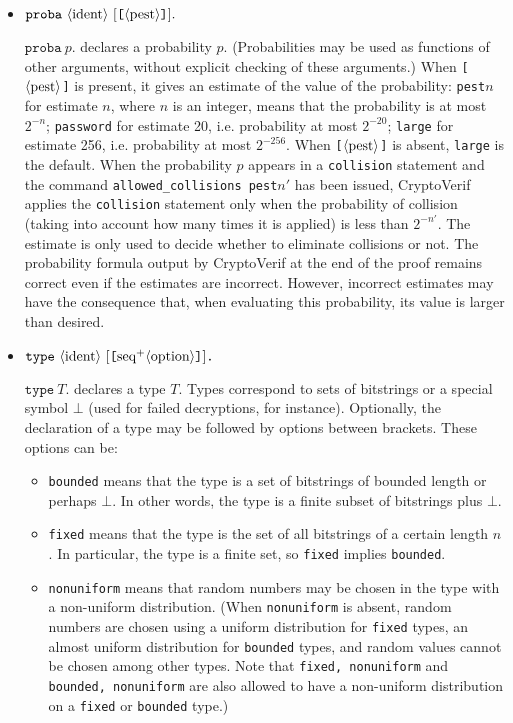 \begin{itemize}
\item $\texttt{proba}\ \nonterm{ident}\ [\texttt{[$\nonterm{pest}$]}].$

$\texttt{proba}\ p\texttt{.}$ declares a probability $p$.
(Probabilities may be used as functions of other arguments,
without explicit checking of these arguments.)
When \texttt{[$\langle\textrm{pest}\rangle$]} is present, 
it gives an estimate of the value of the probability:
\texttt{pest$n$} for estimate $n$, where $n$ is an integer, means that the probability is at most $2^{-n}$;
\texttt{password} for estimate 20, i.e. probability at most $2^{-20}$;
\texttt{large} for estimate 256, i.e. probability at most $2^{-256}$.
When \texttt{[$\langle\textrm{pest}\rangle$]} is absent, \texttt{large} is the default.
%
When the probability $p$ appears in a \texttt{collision} statement and
the command \texttt{allowed\_collisions pest$n'$} has been issued,
CryptoVerif applies the \texttt{collision} statement only when the
probability of collision (taking into account how many times it is
applied) is less than $2^{-n'}$.
The estimate is only used to decide whether to eliminate collisions or not.
The probability formula output by CryptoVerif at the end of the proof
remains correct even if the estimates are incorrect. However,
incorrect estimates may have the consequence that, when evaluating
this probability, its value is larger than desired.

\item $\texttt{type}\ \nonterm{ident}\ [\texttt{[}\neseq{option}\texttt{]}]\texttt{.}$

$\texttt{type}\ T\texttt{.}$ declares a type $T$. Types correspond to sets
of bitstrings or a special symbol $\bot$ (used for failed decryptions, 
for instance). Optionally, the declaration of a type may be followed by options
between brackets. These options can be:
\begin{itemize}

\item \texttt{bounded} means that the type is a set of bitstrings of
bounded length or perhaps $\bot$. In other words, the type is a finite
subset of bitstrings plus $\bot$.

\item \texttt{fixed} means that the type is the set of all bitstrings of 
a certain length $n$. In particular, the type is a finite set,
so \texttt{fixed} implies \texttt{bounded}. 

\item \texttt{nonuniform} means that random numbers may be chosen in
  the type with a non-uniform distribution. (When \texttt{nonuniform}
  is absent, random numbers are chosen using a uniform distribution
  for {\tt fixed} types, an almost uniform distribution for
  \texttt{bounded} types, and random values cannot be chosen among
  other types. Note that \texttt{fixed, nonuniform} and
  \texttt{bounded, nonuniform} are also allowed to have a non-uniform
  distribution on a \texttt{fixed} or \texttt{bounded} type.)


\end{itemize}
\end{itemize}
